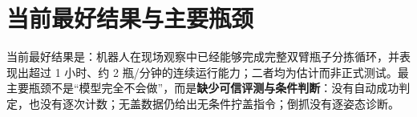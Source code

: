 \section{当前最好结果与主要瓶颈}

当前最好结果是：机器人在现场观察中已经能够完成完整双臂瓶子分拣循环，并表现出超过 1 小时、约 2 瓶/分钟的连续运行能力；二者均为估计而非正式测试。最主要瓶颈不是“模型完全不会做”，而是\textbf{缺少可信评测与条件判断}：没有自动成功判定，也没有逐次计数；无盖数据仍给出无条件拧盖指令；倒抓没有逐姿态诊断。

